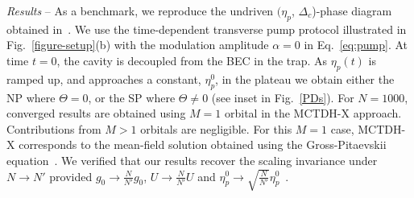 \documentclass[aps,prl,twocolumn,superscriptaddress,groupedaddress]{revtex4}  %
\begin{document}


\textit{Results} -- 
As a benchmark, we reproduce the undriven $(\eta_p$, $\Delta_c$)-phase diagram obtained in~\cite{Baumann:2010}.
We use the time-dependent transverse pump protocol illustrated in Fig.~\ref{figure-setup}(b) with the modulation amplitude $\alpha=0$ in Eq.~\eqref{eq:pump}. 
At time $t=0$, the cavity is decoupled from the BEC in the trap. 
As  $\eta_p(t)$ is ramped up, and approaches a constant, $\eta_p^0$, in the plateau we obtain either the NP where 
$\Theta=0$, or the SP where $\Theta \ne 0$ (see inset in Fig.~\ref{PDs}). 
For $N=1000$, converged results are obtained using $M=1$ orbital in the MCTDH-X approach. Contributions from $M>1$ orbitals are negligible.
For this $M=1$ case, MCTDH-X corresponds to the mean-field solution obtained using the Gross-Pitaevskii equation~\cite{PethickBEC}.
We verified that our results recover the scaling invariance under $N \to N'$ provided  $g_0 \to \frac{N}{N'} g_0$, $U \to \frac{N}{N'} U$ and $\eta_p^0 \to \sqrt{\frac{N}{N'}} \eta_p^0$~\cite{Nagy:2008}.  
\end{document}

